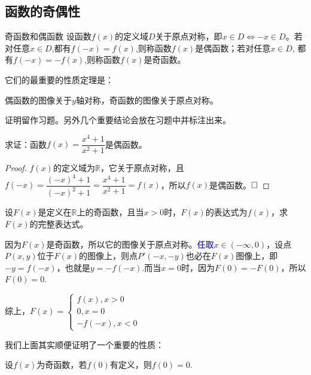\documentclass[lang=cn,math=cm,chinesefont=nofont,11pt,scheme=chinese,onecol]{elegantbook}
\begin{document}
\subsection{函数的奇偶性}

\begin{definition}{奇函数和偶函数}
  设函数$f(x)$的定义域$D$关于原点对称，即$x\in D\Leftrightarrow-x\in D$。若对任意$x\in D$,都有$f(-x)=f(x)$,则称函数$f(x)$是偶函数；若对任意$x\in D$, 都有$f(-x)=-f(x)$,则称函数$f(x)$是奇函数。
\end{definition}

它们的最重要的性质定理是：

\begin{property}
  偶函数的图像关于$y$轴对称，奇函数的图像关于原点对称。
\end{property}

证明留作习题。另外几个重要结论会放在习题中并标注出来。

\begin{example}
  求证：函数$f(x)=\dfrac{x^{4}+1}{x^{2}+1}$是偶函数。
\end{example}

\begin{proof}
  $f(x)$的定义域为$\mathbb{R}$，它关于原点对称，且$f(-x)=\dfrac{(-x)^{4}+1}{(-x)^{2}+1}=\dfrac{x^{4}+1}{x^{2}+1}=f(x)$，所以$f(x)$是偶函数。$\hfill\square$
\end{proof}

\begin{example}
  设$F(x)$是定义在$\mathbb{R}$上的奇函数，且当$x>0$时，$F(x)$的表达式为$f(x)$，求$F(x)$的完整表达式。
\end{example}

\begin{solution}
  因为$F(x)$是奇函数，所以它的图像关于原点对称。\textcolor{blue}{任取}$x\in(-\infty,0)$，设点$P(x,y)$位于$F(x)$的图像上，则点$P'(-x,-y)$也必在$F(x)$图像上，即$-y=f(-x)$，也就是$y=-f(-x)$.而当$x=0$时，因为$F(0)=-F(0)$，所以$F(0)=0$.

  综上，$F(x)=
  \begin{cases}
    f(x),x>0
    \\0,x=0
    \\-f(-x),x<0
  \end{cases}$
\end{solution}

我们上面其实顺便证明了一个重要的性质：

\begin{property}
  设$f(x)$为奇函数，若$f(0)$有定义，则$f(0)=0$.
\end{property}
\end{document}
